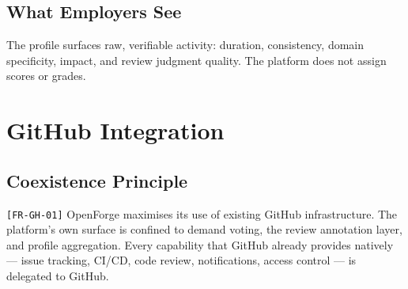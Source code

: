 \documentclass[12pt,a4paper]{article}
\begin{document}
\subsection{What Employers See}
The profile surfaces raw, verifiable activity: duration, consistency, domain specificity, impact, and review judgment quality. The platform does not assign scores or grades.

\section{GitHub Integration}

\subsection{Coexistence Principle}
\texttt{[FR-GH-01]} OpenForge maximises its use of existing GitHub infrastructure. The platform's own surface is confined to demand voting, the review annotation layer, and profile aggregation. Every capability that GitHub already provides natively --- issue tracking, CI/CD, code review, notifications, access control --- is delegated to GitHub.
\end{document}
